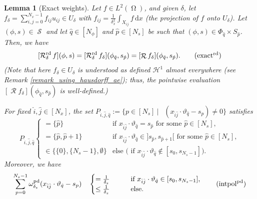 \documentclass[10pt,a4paper]{amsart}
\newtheorem{lemma}{Lemma}
\DeclareMathOperator{\PixelWeight}{\omega^\mathrm{pd}_{\delta_\mathit{s}}}
\DeclareMathOperator{\Radon}{\mathcal{R}}
\DeclareMathOperator{\RayRadon}{\mathcal{R}^\mathrm{rd}_{\delta}}
\newcommand{\dd}[1]{\,\mathrm{d}{#1}}
\DeclareMathOperator{\imgdom}{\Omega}
\DeclareMathOperator{\sinodom}{\mathcal{S}}
\newcommand{\sums}{\sum_{p=0}^{N_s-1}}
\newcommand{\sumx}{\sum_{i,j=0}^{N_x-1}}
\begin{document}
\begin{lemma}[Exact weights] \label{Lemma_weight_length}
Let $f\in L^2(\imgdom)$, and given $\delta$, let $f_\delta =\sumx f_{ij}u_{ij}\in U_\delta$ with $f_{ij}=\frac{1}{\delta_x^2}\int_{X_{ij}}f \dd x$ (the projection of $f$ onto $U_\delta$). Let $(\phi,s)\in \sinodom$ and let $\hat q\in [N_\phi]$ and $\hat p\in [N_s]$ be such that $(\phi,s)\in \Phi_{\hat q}\times S_{\hat p}$. Then, we have
\begin{equation}
\label{equ_lemma_exact_on_U}
[\RayRadon f](\phi,s) = [\RayRadon f_\delta] (\phi_{\hat q},s_{\hat p})= [\Radon f_\delta] (\phi_{\hat q},s_{\hat p}).  
\tag{$\mathrm{exact}^\mathrm{rd}$}
\end{equation}
(Note that here $f_\delta \in U_\delta$ is understood as defined $\mathcal{H}^1$ almost everywhere (see Remark \ref{remark_using_hausdorff_ae}); thus, the pointwise evaluation $[\Radon f_\delta] (\phi_{\hat q},s_{\hat p})$ is well-defined.)

For fixed $\hat i,\hat j\in [N_x]$, the set $P_{\hat i,\hat j,\hat q}:=\{p\in [N_s] \ \big|\ \PixelWeight(x_{\hat i \hat j}\cdot \vartheta_{\hat q} -s_p)\neq 0\}$ satisfies
\begin{equation} \label{equ_lemma_relevant_p_pd}
P_{\hat i,\hat j,\hat q}  \begin{cases}
=\{\hat p\} & \text{if }x_{\hat i \hat j}\cdot\vartheta_{\hat q}=s_{\hat p}  \text{ for some }\hat p\in [N_s],
\\
=\{\hat p,\hat p+1\} \qquad &\text{if }x_{\hat i \hat j}\cdot\vartheta_{\hat q}\in ]s_{\hat p},s_{\hat p+1}[ \text{ for some }\hat p\in [N_s],
\\
\in \{\{0\},\{N_s-1\},\emptyset\} &  \text{else ( if $x_{\hat i \hat j}\cdot\vartheta_{\hat q} \not \in [s_{0},s_{N_s-1}]$)}.
\end{cases}
\end{equation}
Moreover, we have
\begin{equation}
\label{equ_lemma_pixel_sum_s}
    \sums \PixelWeight(x_{\hat i \hat j}\cdot \vartheta_{\hat q} -s_p) \quad  \begin{cases} =\frac{1}{\delta_s} \qquad & \text{if } x_{\hat i \hat j}\cdot \vartheta_{\hat q}\in [s_0,s_{N_s-1}],
    \\
    \leq \frac{1}{\delta_s} & \text{else}.
\end{cases}    
    \tag{$\mathrm{intpol}^{\mathrm {pd}}$}
\end{equation}

\end{lemma}
\end{document}
